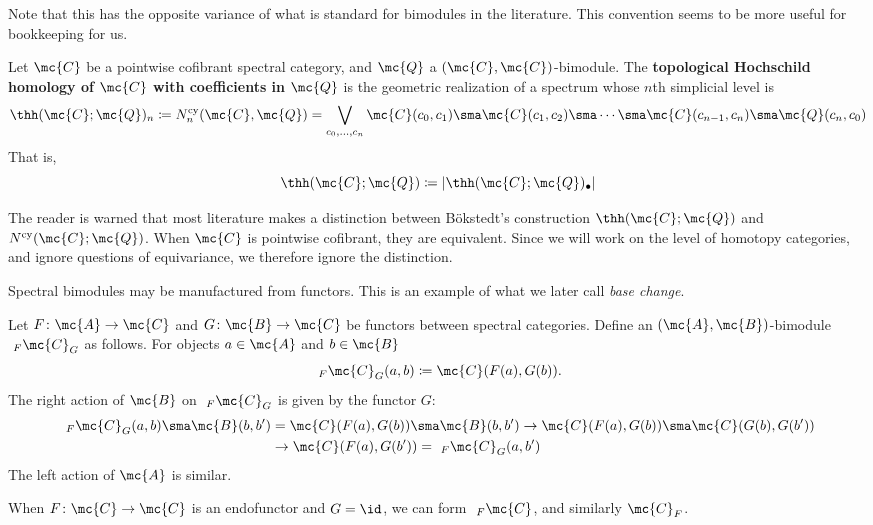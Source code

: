 \documentclass[11pt]{amsart}
\begin{document}
\begin{rmk}
	Note that this has the opposite variance of what is standard for bimodules in the literature. This convention seems to be more useful for bookkeeping for us. 
\end{rmk}

\begin{defn}
  Let $\mc{C}$ be a pointwise cofibrant spectral category, and $\mc{Q}$ a $(\mc{C},\mc{C})$-bimodule. The \textbf{topological Hochschild homology of $\mc{C}$ with coefficients in $\mc{Q}$} is the geometric realization of a spectrum whose $n$th simplicial level is
  \[
  \thh(\mc{C}; \mc{Q})_n \coloneqq N^{\text{cy}}_n (\mc{C}, \mc{Q}) = \bigvee_{c_0, \dots, c_n} \mc{C}(c_0, c_1) \sma \mc{C}(c_1, c_2) \sma \cdots \sma \mc{C}(c_{n-1}, c_n) \sma \mc{Q}(c_n, c_0)
  \]
  That is, 
  \[
  \thh(\mc{C};\mc{Q}) \coloneqq \vert\thh(\mc{C};\mc{Q})_\bullet\vert
  \]
\end{defn}

\begin{rmk}
	The reader is warned that most literature makes a distinction between B\"{o}kstedt's construction $\thh(\mc{C};\mc{Q})$ and $N^{\text{cy}}(\mc{C};\mc{Q})$. When $\mc{C}$ is pointwise cofibrant, they are equivalent.  Since we will work on the level of homotopy categories, and ignore questions of equivariance, we therefore ignore the distinction. 
\end{rmk}

Spectral bimodules may be manufactured from functors. This is an example of what we later call \textit{base change}. 

\begin{defn}\label{def:base_change}
  Let $F\colon  \mc{A} \to \mc{C}$ and  $G\colon  \mc{B} \to \mc{C}$ be functors between spectral categories. Define an $(\mc{A}, \mc{B})$-bimodule $ \ _F \mc{C}_G$ as follows. For objects $a\in \mc{A}$ and $b \in \mc{B}$
  \[
  \ _F \mc{C}_G (a, b) \coloneqq \mc{C}(F(a), G(b)).  
  \]
 The right action of $\mc{B}$ on $\ _F \mc{C}_G$ is given by the functor $G$:
  \begin{align*}
  \ _F \mc{C}_G(a, b) \sma \mc{B} (b, b') &= \mc{C}(F(a),G(b)) \sma \mc{B} (b, b') \to \mc{C}(F(a), G(b)) \sma \mc{C}(G(b), G(b'))\\ &\to \mc{C} (F(a), G(b')) = \ _F \mc{C}_G (a, b') 
  \end{align*}  The left action of $\mc{A}$ is similar.
\end{defn}

\begin{example}
	When $F\colon  \mc{C} \to \mc{C}$ is an endofunctor and $G = \id$, we can form $\ _F \mc{C}$, and similarly $\mc{C}_F$. 
\end{example}
\end{document}
